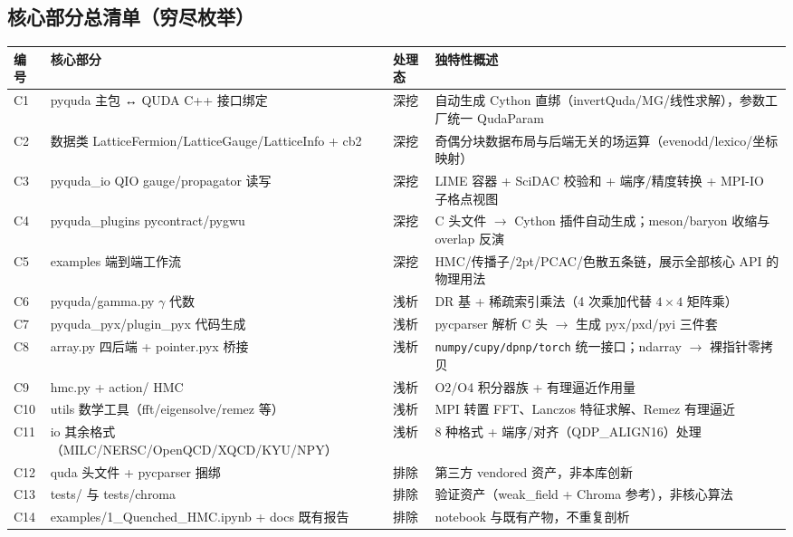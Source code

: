 \documentclass[UTF8]{ctexart}
\begin{document}
\subsection{核心部分总清单（穷尽枚举）}
\begin{xltabular}{\textwidth}{lllX}
\toprule
\textcolor{algo}{编号} & 核心部分 & 处理态 & 独特性概述 \\
\midrule
\endhead
C1 & pyquda 主包 ↔ QUDA C++ 接口绑定 & 深挖 &
自动生成 Cython 直绑（invertQuda/MG/线性求解），参数工厂统一 QudaParam \\
C2 & 数据类 LatticeFermion/LatticeGauge/LatticeInfo + cb2 & 深挖 &
奇偶分块数据布局与后端无关的场运算（evenodd/lexico/坐标映射） \\
C3 & pyquda\_io QIO gauge/propagator 读写 & 深挖 &
LIME 容器 + SciDAC 校验和 + 端序/精度转换 + MPI-IO 子格点视图 \\
C4 & pyquda\_plugins pycontract/pygwu & 深挖 &
C 头文件 $\rightarrow$ Cython 插件自动生成；meson/baryon 收缩与 overlap 反演 \\
C5 & examples 端到端工作流 & 深挖 &
HMC/传播子/2pt/PCAC/色散五条链，展示全部核心 API 的物理用法 \\
C6 & pyquda/gamma.py $\gamma$ 代数 & 浅析 &
DR 基 + 稀疏索引乘法（4 次乘加代替 $4\times4$ 矩阵乘） \\
C7 & pyquda\_pyx/plugin\_pyx 代码生成 & 浅析 &
pycparser 解析 C 头 $\rightarrow$ 生成 pyx/pxd/pyi 三件套 \\
C8 & array.py 四后端 + pointer.pyx 桥接 & 浅析 &
\texttt{\nolinkurl{numpy/cupy/dpnp/torch}} 统一接口；ndarray $\rightarrow$ 裸指针零拷贝 \\
C9 & hmc.py + action/ HMC & 浅析 &
O2/O4 积分器族 + 有理逼近作用量 \\
C10 & utils 数学工具（fft/eigensolve/remez 等） & 浅析 &
MPI 转置 FFT、Lanczos 特征求解、Remez 有理逼近 \\
C11 & io 其余格式（MILC/NERSC/OpenQCD/XQCD/KYU/NPY） & 浅析 &
8 种格式 + 端序/对齐（QDP\_ALIGN16）处理 \\
C12 & quda 头文件 + pycparser 捆绑 & 排除 &
第三方 vendored 资产，非本库创新 \\
C13 & tests/ 与 tests/chroma & 排除 &
验证资产（weak\_field + Chroma 参考），非核心算法 \\
C14 & examples/1\_Quenched\_HMC.ipynb + docs 既有报告 & 排除 &
notebook 与既有产物，不重复剖析 \\
\bottomrule
\end{xltabular}

\end{document}
